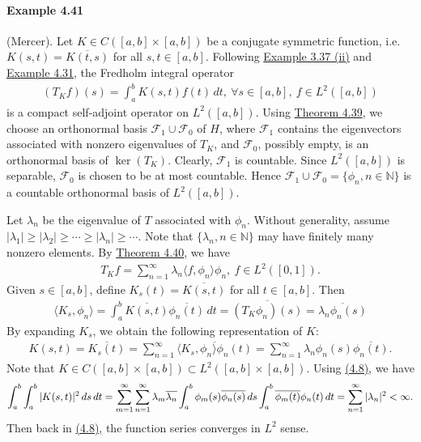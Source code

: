 \documentclass{article}
\begin{document}
\paragraph{Example 4.41} (Mercer). Let $K\in C([a,b]\times[a,b])$ be a conjugate symmetric function, i.e. $K(s,t)=\overline{K(t,s)}$ for all $s,t\in[a,b]$. Following \hyperref[example:3.37]{Example 3.37 (ii)} and \hyperref[example:4.31]{Example 4.31}, the Fredholm integral operator
\begin{align*}
	(T_Kf)(s) = \int_a^b K(s,t)f(t)\,dt,\ \forall s\in[a,b],\ f\in L^2([a,b])
\end{align*}
is a compact self-adjoint operator on $L^2([a,b])$. Using \hyperref[thm:4.39]{Theorem 4.39}, we choose an orthonormal basis $\mathscr{F}_1\cup\mathscr{F}_0$ of $H$, where $\mathscr{F}_1$ contains the eigenvectors associated with nonzero eigenvalues of $T_K$, and $\mathscr{F}_0$, possibly empty, is an orthonormal basis of $\ker(T_K)$. Clearly, $\mathscr{F}_1$ is countable. Since $L^2([a,b])$ is separable, $\mathscr{F}_0$ is chosen to be at most countable. Hence $\mathscr{F}_1\cup\mathscr{F}_0=\{\phi_n,n\in\mathbb{N}\}$ is a countable orthonormal basis of $L^2([a,b])$.

Let $\lambda_n$ be the eigenvalue of $T$ associated with $\phi_n$. Without generality, assume $\vert\lambda_1\vert\geq\vert\lambda_2\vert\geq\cdots\geq\vert\lambda_n\vert\geq\cdots$. Note that $\{\lambda_n,n\in\mathbb{N}\}$ may have finitely many nonzero elements. By \hyperref[thm:4.40]{Theorem 4.40}, we have \vspace{-0.1cm}
\begin{align*}
	T_K f = \sum_{n=1}^\infty \lambda_n\langle f,\phi_n\rangle \phi_n,\ f\in L^2([0,1]).
\end{align*}
Given $s\in[a,b]$, define $K_s(t)=\overline{K(s,t)}$ for all $t\in [a,b]$. Then \vspace{-0.05cm}
\begin{align*}
	\langle K_s,\phi_n\rangle = \int_a^b \overline{K(s,t)}\overline{\phi_n(t)}\,dt = \overline{(T_K\phi_n)(s)} = \overline{\lambda_n\phi_n(s)}
\end{align*}
By expanding $K_s$, we obtain the following representation of $K$: \vspace{-0.05cm}
\begin{align*}
	K(s,t) = \overline{K_s(t)} = \sum_{n=1}^\infty\overline{\langle K_s,\phi_n\rangle\phi_n(t)} = \sum_{n=1}^\infty\lambda_n\phi_n(s)\overline{\phi_n(t)}.\tag{4.8}\label{eq:4.8}
\end{align*}
Note that $K\in C([a,b]\times[a,b])\subset L^2([a,b]\times[a,b])$. Using \hyperref[eq:4.8]{(4.8)}, we have
\begin{align*}
	\int_a^b\int_a^b\vert K(s,t)\vert^2\,ds\,dt = \sum_{m=1}^\infty\sum_{n=1}^\infty \lambda_m\overline{\lambda_n}\int_a^b\phi_m(s)\overline{\phi_n(s)}\,ds\int_a^b\overline{\phi_m(t)}\phi_n(t)\,dt = \sum_{n=1}^\infty\vert\lambda_n\vert^2 < \infty.\vspace{-0.1cm}
\end{align*}
Then back in \hyperref[eq:4.8]{(4.8)}, the function series converges in $L^2$ sense.
\end{document}
